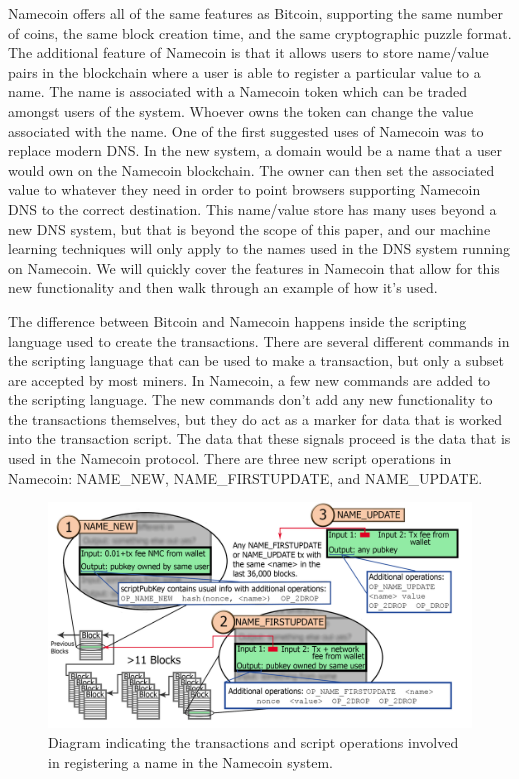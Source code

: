 \documentclass{article} %
\begin{document}
    Namecoin offers all of the same features as Bitcoin, supporting the same number of coins, the same block creation time, and the same cryptographic puzzle format. The additional feature of Namecoin is that it allows users to store name/value pairs in the blockchain where a user is able to register a particular value to a name. The name is associated with a Namecoin token which can be traded amongst users of the system. Whoever owns the token can change the value associated with the name. One of the first suggested uses of Namecoin was to replace modern DNS. In the new system, a domain would be a name that a user would own on the Namecoin blockchain. The owner can then set the associated value to whatever they need in order to point browsers supporting Namecoin DNS to the correct destination. This name/value store has many uses beyond a new DNS system, but that is beyond the scope of this paper, and our machine learning techniques will only apply to the names used in the DNS system running on Namecoin. We will quickly cover the features in Namecoin that allow for this new functionality and then walk through an example of how it's used. 

    The difference between Bitcoin and Namecoin happens inside the scripting language used to create the transactions. There are several different commands in the scripting language that can be used to make a transaction, but only a subset are accepted by most miners. In Namecoin, a few new commands are added to the scripting language. The new commands don't add any new functionality to the transactions themselves, but they do act as a marker for data that is worked into the transaction script. The data that these signals proceed is the data that is used in the Namecoin protocol. There are three new script operations in Namecoin: NAME\_NEW, NAME\_FIRSTUPDATE, and NAME\_UPDATE. 

\begin{figure}
\begin{centering}
\includegraphics[scale=0.8]{registration}
\par\end{centering}
\protect\caption{Diagram indicating the transactions and script operations involved in registering a name in the Namecoin system. \label{fig:registration}}
\end{figure}
\end{document}
